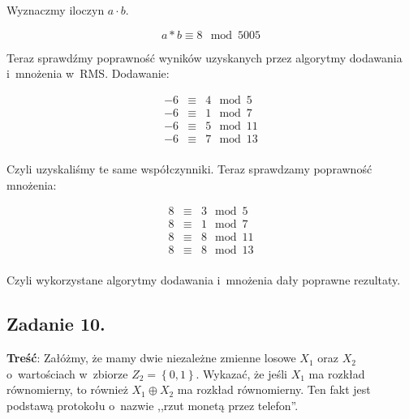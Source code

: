\documentclass[a4paper,10pt, twocolumn]{article}
\begin{document}
\noindent Wyznaczmy iloczyn $a \cdot b$.

\begin{equation*}
	a * b \equiv 8 \mod 5005
\end{equation*}

\noindent Teraz sprawdźmy poprawność wyników uzyskanych przez algorytmy dodawania i~mnożenia w~RMS. Dodawanie:

\begin{equation*}
	\begin{array}{lcl} -6 & \equiv & 4 \mod 5 \\
	-6 & \equiv & 1 \mod 7 \\
	-6 & \equiv & 5 \mod 11 \\
	-6 & \equiv & 7 \mod 13\\
	\end{array}
\end{equation*}

\noindent Czyli uzyskaliśmy te same współczynniki. Teraz sprawdzamy poprawność mnożenia:

\begin{equation*}
	\begin{array}{lcl} 8 & \equiv & 3 \mod 5 \\
	8 & \equiv & 1 \mod 7 \\
	8 & \equiv & 8 \mod 11 \\
	8 & \equiv & 8 \mod 13 \\
	\end{array}
\end{equation*}

\noindent Czyli wykorzystane algorytmy dodawania i~mnożenia dały poprawne rezultaty.

\subsection{Zadanie 10.}
\label{subsec:KolZadanie10}

\textbf{Treść}: Załóżmy, że mamy dwie niezależne zmienne losowe $X_{1}$ oraz $X_{2}$ o~wartościach w~zbiorze $Z_{2} = \left\{0, 1\right\}$. Wykazać, że jeśli $X_{1}$ ma rozkład równomierny, to również $X_{1} \oplus X_{2}$ ma rozkład równomierny. Ten fakt jest podstawą protokołu o~nazwie ,,rzut monetą przez telefon''.
\end{document}
